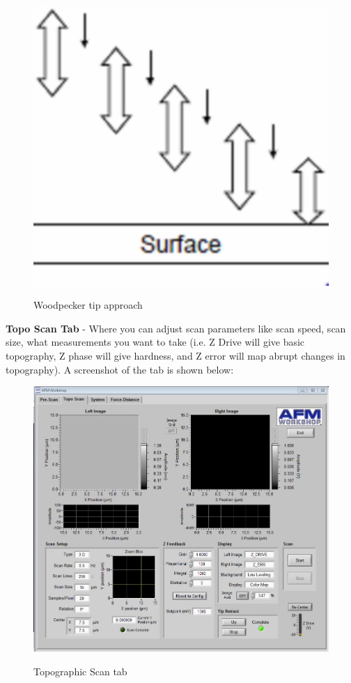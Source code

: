 \documentclass{../lab}
\begin{document}
\begin{itemize}
    \begin{figure}[h]
        \centering
        \href{http://experimentationlab.berkeley.edu/sites/default/files/AFMImages/AFMwoodpecker.png}{\includegraphics[width=0.4\linewidth]{images/AFMwoodpecker.png}}
        \caption{Woodpecker tip approach}
        \label{Woodpecker}
    \end{figure}

\end{itemize}

\textbf{Topo Scan Tab} - Where you can adjust scan parameters like scan speed, scan size, what measurements you want to take (i.e. Z Drive will give basic topography, Z phase will give hardness, and Z error will map abrupt changes in topography). A screenshot of the tab is shown below:

\begin{figure}[h]
\centering
    \href{http://experimentationlab.berkeley.edu/sites/default/files/AFMImages/toposcan.JPG}{\includegraphics[width=0.48\linewidth]{images/toposcan.JPG}}
    \caption{Topographic Scan tab}
\end{figure}
\end{document}
